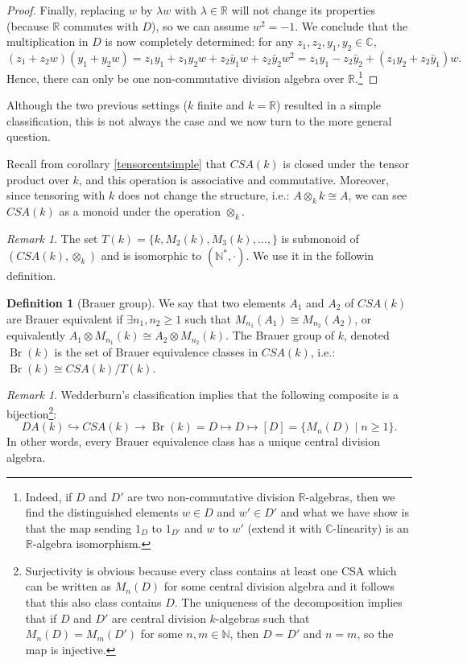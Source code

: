 \documentclass{tufte-handout} %
\theoremstyle{definition}
\newtheorem{defn}[thm]{Definition}
\theoremstyle{remark}
\newtheorem{rem}[thm]{Remark}
\newcommand{\R}{\mathbb{R}}
\newcommand{\N}{\mathbb{N}}
\renewcommand{\C}{\mathbb{C}}
\DeclareMathOperator{\Br}{Br}
\begin{document}
\begin{proof}
	Finally, replacing $w$ by $\lambda w$ with $\lambda \in \R$ will not change its properties (because $\R$ commutes with $D$), so we can assume $w^2 = -1$. We conclude that the multiplication in $D$ is now completely determined: for any $z_1,z_2,y_1,y_2 \in \C$,
	\[(z_1 + z_2w)(y_1+y_2w) = z_1y_1 + z_1y_2w + z_2\bar{y}_1w + z_2\bar{y}_2w^2 = z_1y_1 - z_2\bar{y}_2 + (z_1y_2 + z_2\bar{y}_1)w.\]
	Hence, there can only be one non-commutative division algebra over $\R$.\footnote{Indeed, if $D$ and $D'$ are two non-commutative division $\R$-algebras, then we find the distinguished elements $w \in D$ and $w' \in D'$ and what we have show is that the map sending $1_D$ to $1_{D'}$ and $w$ to $w'$ (extend it with $\C$-linearity) is an $\R$-algebra isomorphism.}
\end{proof}

Although the two previous settings ($k$ finite and $k= \R$) resulted in a simple classification, this is not always the case and we now turn to the more general question.

Recall from corollary \ref{tensorcentsimple} that $CSA(k)$ is closed under the tensor product over $k$, and this operation is associative and commutative. Moreover, since tensoring with $k$ does not change the structure, i.e.: $A \otimes_k k \cong A$, we can see $CSA(k)$ as a monoid under the operation $\otimes_k$.

\begin{rem}
	The set $T(k) = \{k, M_2(k), M_3(k), \dots, \}$ is submonoid of $(CSA(k), \otimes_k)$ and is isomorphic to $(\N^*, \cdot)$. We use it in the followin definition.
\end{rem}

\begin{defn}[Brauer group]
	We say that two elements $A_1$ and $A_2$ of $CSA(k)$ are Brauer equivalent if $\exists n_1, n_2 \geq 1$ such that $M_{n_1}(A_1) \cong M_{n_2}(A_2)$, or equivalently $A_1 \otimes M_{n_1}(k) \cong A_2 \otimes M_{n_2}(k)$. The Brauer group of $k$, denoted $\Br(k)$ is the set of Brauer equivalence classes in $CSA(k)$, i.e.: $\Br(k) \cong CSA(k)/T(k)$.
\end{defn}
\begin{rem}
	Wedderburn's classification implies that the following composite is a bijection\footnote{Surjectivity is obvious because every class contains at least one CSA which can be written as $M_n(D)$ for some central division algebra and it follows that this also class contains $D$. The uniqueness of the decomposition implies that if $D$ and $D'$ are central division $k$-algebras such that $M_{n}(D) = M_{m}(D')$ for some $n,m \in \N$, then $D = D'$ and $n = m$, so the map is injective.}:
	\[DA(k) \hookrightarrow CSA(k) \rightarrow \Br(k) = D \mapsto D \mapsto [D] = \{M_n(D) \mid n \geq 1\}.\]
	In other words, every Brauer equivalence class has a unique central division algebra.
\end{rem}
\end{document}
